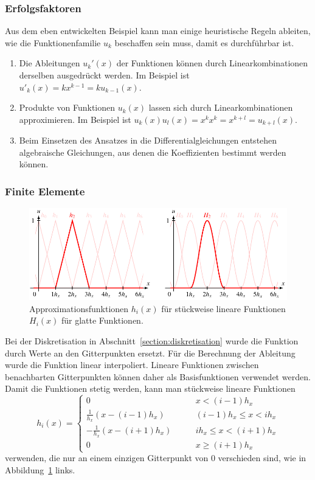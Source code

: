 \subsubsection{Erfolgsfaktoren}
Aus dem eben entwickelten Beispiel kann man einige heuristische Regeln ableiten,
wie die Funktionenfamilie $u_k$ beschaffen sein muss, damit es
durchführbar ist.
\begin{enumerate}
\item Die Ableitungen $u_k'(x)$ der Funktionen können durch
Linearkombinationen derselben ausgedrückt werden.
Im Beispiel ist $u'_k(x)=kx^{k-1}=ku_{k-1}(x)$.
\item Produkte von Funktionen $u_k(x)$ lassen sich durch Linearkombinationen
approximieren.
Im Beispiel ist $u_k(x)u_l(x)=x^kx^k = x^{k+l}=u_{k+l}(x)$.
\item Beim Einsetzen des Ansatzes in die Differentialgleichungen
entstehen algebraische Gleichungen, aus denen die Koeffizienten
bestimmt werden können.
\end{enumerate}

\subsubsection{Finite Elemente}
\begin{figure}
\centering
\includegraphics[width=\hsize]{chapters/2/fe.pdf}
\caption{Approximationsfunktionen $h_i(x)$ für stückweise lineare Funktionen 
$H_i(x)$ für glatte Funktionen.
\label{skript:finiteelemente}}
\end{figure}
Bei der Diskretisation in Abschnitt~\ref{section:diskretisation} wurde die
Funktion durch Werte an den Gitterpunkten ersetzt.
Für die Berechnung der Ableitung wurde die Funktion linear interpoliert.
Lineare Funktionen zwischen benachbarten Gitterpunkten können daher als
Basisfunktionen verwendet werden.
Damit die Funktionen stetig werden, kann man stückweise lineare
Funktionen
\[
h_i(x) =
\begin{cases}
0&\qquad x< (i-1)h_x\\
\frac{1}{h_x}(x-(i-1)h_x)&\qquad (i-1)h_x \le x < ih_x\\
-\frac{1}{h_x}(x-(i+1)h_x)&\qquad ih_x \le x < (i+1)h_x\\
0&\qquad x \ge (i+1)h_x
\end{cases}
\]
verwenden, die nur an einem einzigen Gitterpunkt von $0$
verschieden sind, wie in Abbildung~\ref{skript:finiteelemente} links.

